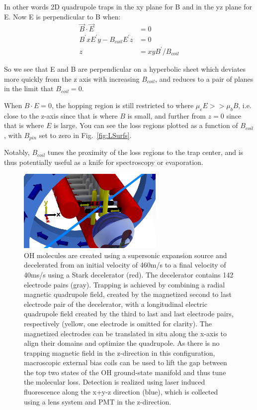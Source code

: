 \documentclass[%
 reprint,
 amsmath,amssymb,
 aps,
prl,
]{revtex4-1}
\begin{document}
In other words 2D quadrupole traps in the xy plane for B and in the yz plane for E. Now E is perpendicular to B when:
\begin{eqnarray}
\vec{B}\cdot \vec{E} &= 0\\
B^\prime x E^\prime y - B_{coil}  E^\prime z &= 0\\
z &= xyB^\prime/B_{coil}
\end{eqnarray}

So we see that E and B are perpendicular on a hyperbolic sheet which deviates more quickly from the z axis with increasing $B_{coil}$, and reduces to a pair of planes in the limit that $B_{coil} = 0$.

When $B\cdot E = 0$, the hopping region is still restricted to where $\mu_eE >> \mu_b B$, i.e. close to the z-axis since that is where $B$ is small, and further from $z=0$ since that is where $E$ is large. You can see the loss regions plotted as a function of $B_{coil}$, with $B_{pin}$ set to zero in Fig.~\ref{fig:LSurfs}.

Notably, $B_{coil}$ tunes the proximity of the loss regions to the trap center, and is thus potentially useful as a knife for spectroscopy or evaporation.

\begin{figure}[b]
\includegraphics[width=70mm]{blue-red-yellow-v2_CAD.png}%
\caption{
OH molecules are created using a supersonic expansion source and decelerated from an initial velocity of 460m/s to a final velocity of 40ms/s using a Stark decelerator (red). The decelerator contains 142 electrode pairs (gray). Trapping is achieved by combining a radial magnetic quadrupole field, created by the magnetized second to last electrode pair of the decelerator, with a longitudinal electric quadrupole field created by the third to last and last electrode pairs, respectively (yellow, one electrode is omitted for clarity). The magnetized electrodes can be translated in situ along the x-axis to align their domains and optimize the quadrupole. As there is no trapping magnetic field in the z-direction in this configuration, macroscopic external bias coils can be used to lift the gap between the top two states of the OH ground-state manifold and thus tune the molecular loss. Detection is realized using laser induced fluorescence along the x+y-z direction (blue), which is collected using a lens system and PMT in the z-direction.
\label{fig:CAD}}
\end{figure}
\end{document}
